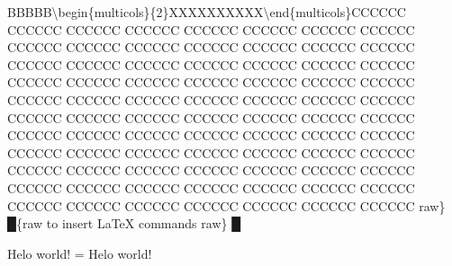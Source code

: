BBBBB\textbackslash{}begin\{multicols\}\{2\}XXXXXXXXXX\textbackslash{}end\{multicols\}CCCCCC CCCCCC CCCCCC CCCCCC CCCCCC CCCCCC CCCCCC CCCCCC CCCCCC CCCCCC
CCCCCC CCCCCC CCCCCC CCCCCC CCCCCC CCCCCC CCCCCC CCCCCC CCCCCC CCCCCC CCCCCC CCCCCC CCCCCC CCCCCC CCCCCC CCCCCC CCCCCC
CCCCCC CCCCCC CCCCCC CCCCCC CCCCCC CCCCCC CCCCCC CCCCCC CCCCCC CCCCCC CCCCCC CCCCCC CCCCCC CCCCCC CCCCCC CCCCCC CCCCCC
CCCCCC CCCCCC CCCCCC CCCCCC CCCCCC CCCCCC CCCCCC CCCCCC CCCCCC CCCCCC CCCCCC CCCCCC CCCCCC CCCCCC CCCCCC CCCCCC CCCCCC
CCCCCC CCCCCC CCCCCC CCCCCC CCCCCC CCCCCC CCCCCC CCCCCC CCCCCC CCCCCC CCCCCC CCCCCC CCCCCC CCCCCC CCCCCC CCCCCC CCCCCC
{\mktsStyleBold\color{violet}{\mktsStyleSymbol}raw\} {\mktsStyleSymbol█}}{\mktsStyleBold\color{violet}{\mktsStyleSymbol█}\{raw {\mktsStyleSymbol}}to insert \LaTeX{} commands
{\mktsStyleBold\color{violet}{\mktsStyleSymbol}raw\} {\mktsStyleSymbol█}}
\mktsShowpar\par
\begin{multicols}{2}
\end{multicols}Helo {\mktsStyleCode{}world}! = Helo {\mktsStyleCode{}world}!\mktsShowpar\par
